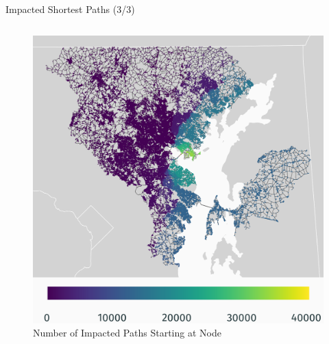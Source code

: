 \documentclass{beamer}
\numberwithin{figure}{section} %
\numberwithin{table}{section} %
\begin{document}
\begin{frame}{Impacted Shortest Paths (3/3)}
    \begin{columns}
        \begin{column}{0.5\textwidth}
            \begin{figure}
                \centering
                \includegraphics[width=\textwidth]{maps/no_changed_paths.png}
                {\scriptsize Number of Impacted Paths Starting at Node}
            \end{figure}
        \end{column}


\end{columns}
\end{frame}
\end{document}
